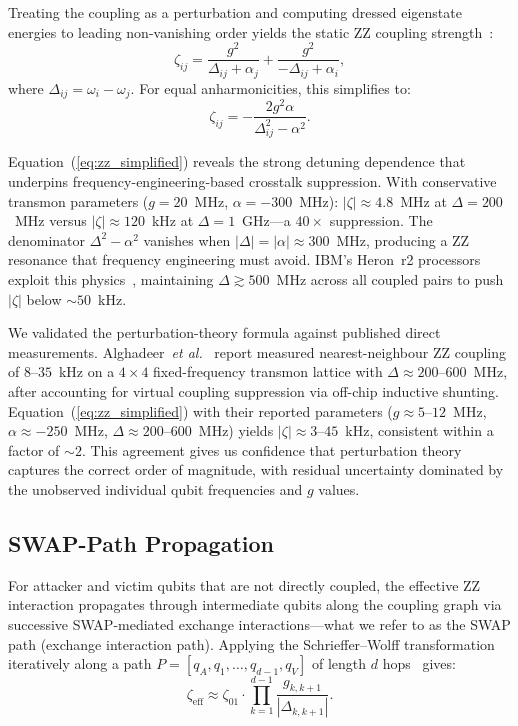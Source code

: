 \documentclass[ASNA,twocolumn]{USG}
\begin{document}
Treating the coupling as a perturbation and computing dressed eigenstate energies to leading non-vanishing order yields the static ZZ coupling strength~\cite{ding2020crosstalk,sarovar2020detecting}:
\begin{equation}
    \zeta_{ij} = \frac{g^2}{\Delta_{ij} + \alpha_j} + \frac{g^2}{-\Delta_{ij} + \alpha_i},
\label{eq:zz_coupling}
\end{equation}
where $\Delta_{ij} = \omega_i - \omega_j$. For equal anharmonicities, this simplifies to:
\begin{equation}
    \zeta_{ij} = -\frac{2g^2\alpha}{\Delta_{ij}^2 - \alpha^2}.
\label{eq:zz_simplified}
\end{equation}

Equation~(\ref{eq:zz_simplified}) reveals the strong detuning dependence that underpins frequency-engineering-based crosstalk suppression. With conservative transmon parameters ($g = 20$~MHz, $\alpha = -300$~MHz): $|\zeta| \approx 4.8$~MHz at $\Delta = 200$~MHz versus $|\zeta| \approx 120$~kHz at $\Delta = 1$~GHz---a $40\times$ suppression. The denominator $\Delta^2 - \alpha^2$ vanishes when $|\Delta| = |\alpha| \approx 300$~MHz, producing a ZZ resonance that frequency engineering must avoid. IBM's Heron~r2 processors exploit this physics~\cite{ibmq2026}, maintaining $\Delta \gtrsim 500$~MHz across all coupled pairs to push $|\zeta|$ below $\sim 50$~kHz.

We validated the perturbation-theory formula against published direct measurements. Alghadeer~\emph{et al.}~\cite{alghadeer2025crosstalk} report measured nearest-neighbour ZZ coupling of $8$--$35$~kHz on a $4\times4$ fixed-frequency transmon lattice with $\Delta \approx 200$--$600$~MHz, after accounting for virtual coupling suppression via off-chip inductive shunting. Equation~(\ref{eq:zz_simplified}) with their reported parameters ($g \approx 5$--$12$~MHz, $\alpha \approx -250$~MHz, $\Delta \approx 200$--$600$~MHz) yields $|\zeta| \approx 3$--$45$~kHz, consistent within a factor of $\sim 2$. This agreement gives us confidence that perturbation theory captures the correct order of magnitude, with residual uncertainty dominated by the unobserved individual qubit frequencies and $g$ values.

\subsection{SWAP-Path Propagation}

For attacker and victim qubits that are not directly coupled, the effective ZZ interaction propagates through intermediate qubits along the coupling graph via successive SWAP-mediated exchange interactions---what we refer to as the SWAP path (exchange interaction path). Applying the Schrieffer--Wolff transformation iteratively along a path $P = [q_A, q_1, \ldots, q_{d-1}, q_V]$ of length $d$ hops~\cite{ding2020crosstalk} gives:
\begin{equation}
    \zeta_{\mathrm{eff}} \approx \zeta_{01} \cdot \prod_{k=1}^{d-1} \frac{g_{k,k+1}}{|\Delta_{k,k+1}|}.
\label{eq:swap_path}
\end{equation}
\end{document}
